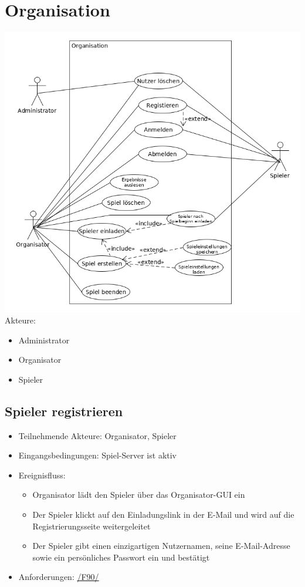 \documentclass[a4paper]{scrreprt}
\begin{document}
    \section{Organisation}
    \includegraphics[width=\textwidth]{uml/export/Organisation.png}
    Akteure:
    \begin{itemize}
        \item \Gls{Administrator}
        \item \Gls{Organisator}
        \item \Gls{Spieler}
    \end{itemize}
    \newpage
   \subsection{Spieler registrieren}
    \begin{itemize}
        \item Teilnehmende Akteure: \Gls{Organisator}, \Gls{Spieler}
        \item Eingangsbedingungen: \Gls{Spiel-Server} ist aktiv
        \item Ereignisfluss:
        \begin{itemize}
            \item \Gls{Organisator} lädt den \Gls{Spieler} über das Organisator-GUI ein
            \item Der \Gls{Spieler} klickt auf den Einladungslink in der E-Mail und wird auf die Registrierungsseite weitergeleitet
            \item Der \Gls{Spieler} gibt einen einzigartigen Nutzernamen, seine E-Mail-Adresse sowie ein persönliches Passwort ein und bestätigt
        \end{itemize}
        \item Anforderungen: \hyperlink{F90}{/F90/}
    \end{itemize}
\end{document}

